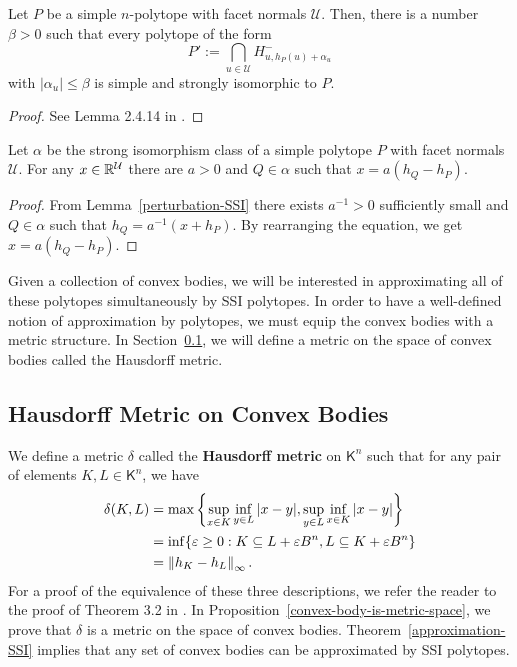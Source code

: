 \documentclass{puthesis-UG}
\begin{document}
\begin{lem} \label{perturbation-SSI}
	Let $P$ be a simple $n$-polytope with facet normals $\mathcal{U}$. Then, there is a number $\beta > 0$ such that every polytope of the form 
	\[
		P' := \bigcap_{u \in \mathcal{U}} H_{u, h_P(u) + \alpha_u}^-
	\]
	with $|\alpha_u| \leq \beta$ is simple and strongly isomorphic to $P$. 
\end{lem}

\begin{proof}
	See Lemma 2.4.14 in \cite{schneider_2013}. 
\end{proof}

\begin{cor} \label{difference-of-support-vectors}
	Let $\alpha$ be the strong isomorphism class of a simple polytope $P$ with facet normals $\mathcal{U}$. For any $x \in \mathbb{R}^{\mathcal{U}}$ there are $a > 0$ and $Q \in \alpha$ such that $x = a (h_Q - h_P)$. 
\end{cor}

\begin{proof}
	From Lemma~\ref{perturbation-SSI} there exists $a^{-1} > 0$ sufficiently small and $Q \in \alpha$ such that $h_Q = a^{-1}(x + h_P)$. By rearranging the equation, we get $x = a(h_Q - h_P)$. 
\end{proof}

Given a collection of convex bodies, we will be interested in approximating all of these polytopes simultaneously by SSI polytopes. In order to have a well-defined notion of approximation by polytopes, we must equip the convex bodies with a metric structure. In Section~\ref{sec:hausdorff-metric}, we will define a metric on the space of convex bodies called the Hausdorff metric. 

\subsection{Hausdorff Metric on Convex Bodies} \label{sec:hausdorff-metric}

We define a metric $\delta$ called the \textbf{Hausdorff metric} on $\mathsf{K}^n$ such that for any pair of elements $K, L \in \mathsf{K}^n$, we have 
\begin{align*}
	\delta (K, L) & = \max \left \{ \sup_{x \in K} \inf_{y \in L} |x-y|, \sup_{y \in L} \inf_{x \in K} |x-y|\right \} \\
	& = \inf \{\varepsilon \geq 0 : K \subseteq L + \varepsilon B^n, L \subseteq K + \varepsilon B^n\} \\
	& = \left\lVert h_K - h_L\right\rVert_\infty.
\end{align*}
For a proof of the equivalence of these three descriptions, we refer the reader to the proof of Theorem 3.2 in \cite{Hug2020-ue}. In Proposition~\ref{convex-body-is-metric-space}, we prove that $\delta$ is a metric on the space of convex bodies. Theorem~\ref{approximation-SSI} implies that any set of convex bodies can be approximated by SSI polytopes.
\end{document}
